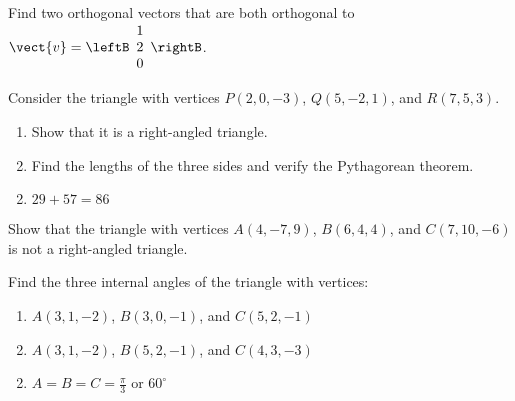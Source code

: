 \begin{multicols}{2}
\begin{ex}
\begin{sol}
\begin{enumerate}[label={\alph*.}]
\end{enumerate}
\end{sol}
\end{ex}

\begin{ex}
Find two orthogonal vectors that are both orthogonal to $\vect{v} = \leftB
\begin{array}{r}
1\\
2\\
0
\end{array}
\rightB$.
\end{ex}

\begin{ex}
Consider the triangle with vertices $P(2, 0, -3)$, $Q(5, -2, 1)$, and $R(7, 5, 3)$.


\begin{enumerate}[label={\alph*.}]
\item Show that it is a right-angled triangle.

\item Find the lengths of the three sides and verify the Pythagorean theorem.

\end{enumerate}
\begin{sol}
\begin{enumerate}[label={\alph*.}]
\setcounter{enumi}{1}
\item  $29 + 57 = 86$

\end{enumerate}
\end{sol}
\end{ex}

\begin{ex}
Show that the triangle with vertices $A(4, -7, 9)$, $B(6, 4, 4)$, and $C(7, 10, -6)$ is not a right-angled triangle.
\end{ex}

\begin{ex}
Find the three internal angles of the triangle with vertices:


\begin{enumerate}[label={\alph*.}]
\item $A(3, 1, -2)$, $B(3, 0, -1)$, and $C(5, 2, -1)$

\item $A(3, 1, -2)$, $B(5, 2, -1)$, and $C(4, 3, -3)$

\end{enumerate}
\begin{sol}
\begin{enumerate}[label={\alph*.}]
\setcounter{enumi}{1}
\item $A = B = C = \frac{\pi}{3}$ or $60^\circ$ 


\end{enumerate}
\end{sol}
\end{ex}
\end{multicols}
